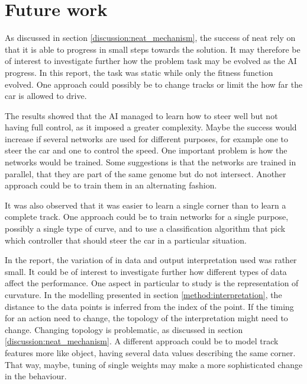\chapter{Future work}


As discussed in section \ref{discussion:neat_mechanism}, the success of neat rely on that it is able to progress in small steps towards the solution. It may therefore be of interest to investigate further how the problem task may be evolved as the AI progress. In this report, the task was static while only the fitness function evolved. One approach could possibly be to change tracks or limit the how far the car is allowed to drive.

The results showed that the AI managed to learn how to steer well but not having full control, as it imposed a greater complexity. Maybe the success would increase if several networks are used for different purposes, for example one to steer the car and one to control the speed. One important problem is how the networks would be trained. Some suggestions is that the networks are trained in parallel, that they are part of the same genome but do not intersect. Another approach could be to train them in an alternating fashion.

It was also observed that it was easier to learn a single corner than to learn a complete track. One approach could be to train networks for a single purpose, possibly a single type of curve, and to use a classification algorithm that pick which controller that should steer the car in a particular situation.

In the report, the variation of in data and output interpretation used was rather small. It could be of interest to investigate further how different types of data affect the performance. One aspect in particular to study is the representation of curvature. In the modelling presented in section \ref{method:interpretation}, the distance to the data points is inferred from the index of the point. If the timing for an action need to change, the topology of the interpretation might need to change. Changing topology is problematic, as discussed in section \ref{discussion:neat_mechanism}. A different approach could be to model track features more like object, having several data values describing the same corner. That way, maybe, tuning of single weights may make a more sophisticated change in the behaviour.


